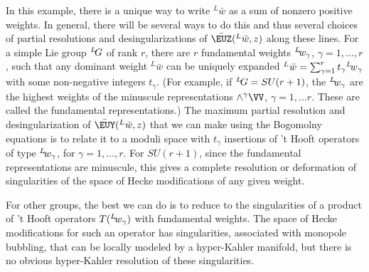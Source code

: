 In this example, there is a unique way to write $^L\bar w$ as a
sum of nonzero positive weights.  In general, there will be
several ways to do this and thus several choices of partial
resolutions and desingularizations of $\bar {{\EUZ}}(^L\bar w,z)$
along these lines.  For a simple Lie group $^L\negthinspace G$ of
rank $r$, there are $r$ fundamental weights $^L\negthinspace
w_\gamma$, $\gamma=1,\dots,r$, such that any dominant weight
$^L\bar w$ can be uniquely expanded $^L\bar
w=\sum_{\gamma=1}^r t_\gamma {}^L\negthinspace w_\gamma$ with some
non-negative integers $t_\gamma$.  (For example, if
$^L\negthinspace G=SU(r+1)$, the $^L\negthinspace w_\gamma$ are
the highest weights of the minuscule representations
$\wedge^\gamma \VV$, $\gamma=1,\dots r$. These are called the
fundamental representations.) The maximum partial resolution and
desingularization of $\bar {{\EUY}}(^L\bar w,z)$ that we can make
using the Bogomolny equations is to relate it to a moduli space
with $t_\gamma$ insertions of 't Hooft operators of type
$^L\negthinspace w_\gamma$, for $\gamma=1,\dots,r$.  For
$SU(r+1)$, since the fundamental representations  are minuscule,
this gives a complete resolution or deformation of singularities
of the space of Hecke modifications of any given weight.

For other groups, the best we can do is to reduce to the
singularities of a product of 't Hooft operators
$T({}^L\negthinspace w_\gamma)$ with fundamental weights.  The
space of Hecke modifications for such an operator has
singularities, associated with monopole bubbling, that can be
locally modeled by a hyper-Kahler manifold, but there is no
obvious hyper-Kahler resolution of these singularities.
